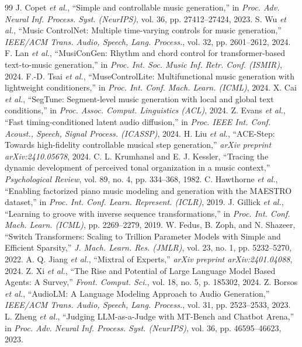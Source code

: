 \documentclass[conference]{IEEEtran}
\begin{document}
\begin{thebibliography}{99}
 J. Copet \textit{et al.}, ``Simple and controllable music generation,'' in \textit{Proc. Adv. Neural Inf. Process. Syst. (NeurIPS)}, vol. 36, pp. 27412--27424, 2023.
 S. Wu \textit{et al.}, ``Music ControlNet: Multiple time-varying controls for music generation,'' \textit{IEEE/ACM Trans. Audio, Speech, Lang. Process.}, vol. 32, pp. 2601--2612, 2024.
 F. Lan \textit{et al.}, ``MusiConGen: Rhythm and chord control for transformer-based text-to-music generation,'' in \textit{Proc. Int. Soc. Music Inf. Retr. Conf. (ISMIR)}, 2024.
 F.-D. Tsai \textit{et al.}, ``MuseControlLite: Multifunctional music generation with lightweight conditioners,'' in \textit{Proc. Int. Conf. Mach. Learn. (ICML)}, 2024.
 X. Cai \textit{et al.}, ``SegTune: Segment-level music generation with local and global text conditions,'' in \textit{Proc. Assoc. Comput. Linguistics (ACL)}, 2024.
 Z. Evans \textit{et al.}, ``Fast timing-conditioned latent audio diffusion,'' in \textit{Proc. IEEE Int. Conf. Acoust., Speech, Signal Process. (ICASSP)}, 2024.
 H. Liu \textit{et al.}, ``ACE-Step: Towards high-fidelity controllable musical step generation,'' \textit{arXiv preprint arXiv:2410.05678}, 2024.
 C. L. Krumhansl and E. J. Kessler, ``Tracing the dynamic development of perceived tonal organization in a music context,'' \textit{Psychological Review}, vol. 89, no. 4, pp. 334--368, 1982.
 C. Hawthorne \textit{et al.}, ``Enabling factorized piano music modeling and generation with the MAESTRO dataset,'' in \textit{Proc. Int. Conf. Learn. Represent. (ICLR)}, 2019.
 J. Gillick \textit{et al.}, ``Learning to groove with inverse sequence transformations,'' in \textit{Proc. Int. Conf. Mach. Learn. (ICML)}, pp. 2269--2279, 2019.
 W. Fedus, B. Zoph, and N. Shazeer, ``Switch Transformers: Scaling to Trillion Parameter Models with Simple and Efficient Sparsity,'' \textit{J. Mach. Learn. Res. (JMLR)}, vol. 23, no. 1, pp. 5232--5270, 2022.
 A. Q. Jiang \textit{et al.}, ``Mixtral of Experts,'' \textit{arXiv preprint arXiv:2401.04088}, 2024.
 Z. Xi \textit{et al.}, ``The Rise and Potential of Large Language Model Based Agents: A Survey,'' \textit{Front. Comput. Sci.}, vol. 18, no. 5, p. 185302, 2024.
 Z. Borsos \textit{et al.}, ``AudioLM: A Language Modeling Approach to Audio Generation,'' \textit{IEEE/ACM Trans. Audio, Speech, Lang. Process.}, vol. 31, pp. 2523--2533, 2023.
 L. Zheng \textit{et al.}, ``Judging LLM-as-a-Judge with MT-Bench and Chatbot Arena,'' in \textit{Proc. Adv. Neural Inf. Process. Syst. (NeurIPS)}, vol. 36, pp. 46595--46623, 2023.
\end{thebibliography}
\end{document}
